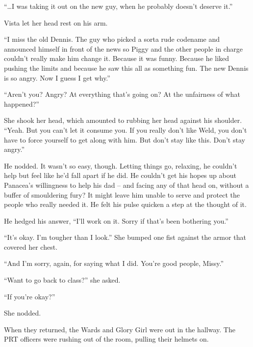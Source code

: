 ``\ldots{}I was taking it out on the new guy, when he probably doesn't deserve it.''



Vista let her head rest on his arm.



``I miss the old Dennis.  The guy who picked a sorta rude codename and announced himself in front of the news so Piggy and the other people in charge couldn't really make him change it.  Because it was funny.  Because he liked pushing the limits and because he saw this all as something fun.  The new Dennis is so angry.  Now I guess I get why.''



``Aren't you?  Angry?  At everything that's going on?  At the unfairness of what happened?''



She shook her head, which amounted to rubbing her head against his shoulder.  ``Yeah.  But you can't let it consume you.  If you really don't like Weld, you don't have to force yourself to get along with him.  But don't stay like this.  Don't stay angry.''



He nodded.  It wasn't so easy, though.  Letting things go, relaxing, he couldn't help but feel like he'd fall apart if he did.  He couldn't get his hopes up about Panacea's willingness to help his dad – and facing any of that head on, without a buffer of smouldering fury?  It might leave him unable to serve and protect the people who really needed it.  He felt his pulse quicken a step at the thought of it.



He hedged his answer, ``I'll work on it.  Sorry if that's been bothering you.''



``It's okay.  I'm tougher than I look.''  She bumped one fist against the armor that covered her chest.



``And I'm sorry, again, for saying what I did.  You're good people, Missy.''



``Want to go back to class?'' she asked.



``If you're okay?''



She nodded.



When they returned, the Wards and Glory Girl were out in the hallway.  The PRT officers were rushing out of the room, pulling their helmets on.



